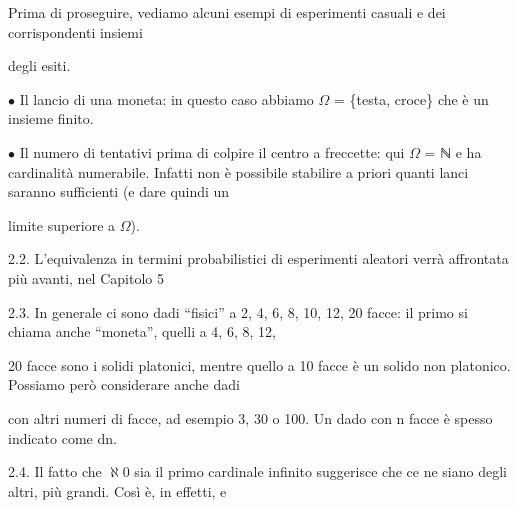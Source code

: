 \documentclass[a4paper,portrait,12pt]{article}
\begin{document}
\begin{flushleft}
Prima di proseguire, vediamo alcuni esempi di esperimenti casuali e dei corrispondenti insiemi
\end{flushleft}


\begin{flushleft}
degli esiti.
\end{flushleft}


\begin{flushleft}
$\bullet$ Il lancio di una moneta: in questo caso abbiamo $\Omega$ = \{testa, croce\} che \`{e} un insieme finito.
\end{flushleft}


\begin{flushleft}
$\bullet$ Il numero di tentativi prima di colpire il centro a freccette: qui $\Omega$ = ℕ e ha cardinalit\`{a} numerabile. Infatti non \`{e} possibile stabilire a priori quanti lanci saranno sufficienti (e dare quindi un
\end{flushleft}


\begin{flushleft}
limite superiore a $\Omega$).
\end{flushleft}


\begin{flushleft}
2.2. L'equivalenza in termini probabilistici di esperimenti aleatori verr\`{a} affrontata più avanti, nel Capitolo 5
\end{flushleft}


\begin{flushleft}
2.3. In generale ci sono dadi {``}fisici'' a 2, 4, 6, 8, 10, 12, 20 facce: il primo si chiama anche {``}moneta'', quelli a 4, 6, 8, 12,
\end{flushleft}


\begin{flushleft}
20 facce sono i solidi platonici, mentre quello a 10 facce \`{e} un solido non platonico. Possiamo per\`{o} considerare anche dadi
\end{flushleft}


\begin{flushleft}
con altri numeri di facce, ad esempio 3, 30 o 100. Un dado con n facce \`{e} spesso indicato come dn.
\end{flushleft}


\begin{flushleft}
2.4. Il fatto che $\aleph$0 sia il primo cardinale infinito suggerisce che ce ne siano degli altri, più grandi. Così \`{e}, in effetti, e
\end{flushleft}
\end{document}
